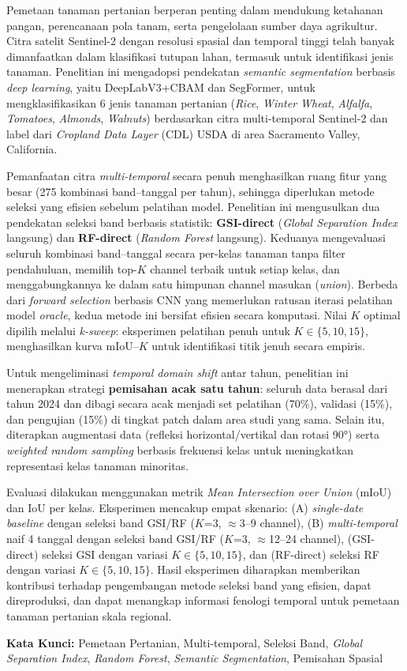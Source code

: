 Pemetaan tanaman pertanian berperan penting dalam mendukung ketahanan pangan, perencanaan pola tanam, serta pengelolaan sumber daya agrikultur.
Citra satelit Sentinel-2 dengan resolusi spasial dan temporal tinggi telah banyak dimanfaatkan dalam klasifikasi tutupan lahan, termasuk untuk identifikasi jenis tanaman.
Penelitian ini mengadopsi pendekatan \textit{semantic segmentation} berbasis \textit{deep learning}, yaitu DeepLabV3+CBAM dan SegFormer, untuk mengklasifikasikan 6 jenis tanaman pertanian (\textit{Rice}, \textit{Winter Wheat}, \textit{Alfalfa}, \textit{Tomatoes}, \textit{Almonds}, \textit{Walnuts}) berdasarkan citra multi-temporal Sentinel-2 dan label dari \textit{Cropland Data Layer} (CDL) USDA di area Sacramento Valley, California.

Pemanfaatan citra \textit{multi-temporal} secara penuh menghasilkan ruang fitur yang besar (275 kombinasi band--tanggal per tahun), sehingga diperlukan metode seleksi yang efisien sebelum pelatihan model.
Penelitian ini mengusulkan dua pendekatan seleksi band berbasis statistik: \textbf{GSI-direct} (\textit{Global Separation Index} langsung) dan \textbf{RF-direct} (\textit{Random Forest} langsung).
Keduanya mengevaluasi seluruh kombinasi band--tanggal secara per-kelas tanaman tanpa filter pendahuluan, memilih top-$K$ channel terbaik untuk setiap kelas, dan menggabungkannya ke dalam satu himpunan channel masukan (\textit{union}).
Berbeda dari \textit{forward selection} berbasis CNN yang memerlukan ratusan iterasi pelatihan model \textit{oracle}, kedua metode ini bersifat efisien secara komputasi.
Nilai $K$ optimal dipilih melalui \textit{k-sweep}: eksperimen pelatihan penuh untuk $K \in \{5, 10, 15\}$, menghasilkan kurva mIoU--$K$ untuk identifikasi titik jenuh secara empiris.

Untuk mengeliminasi \textit{temporal domain shift} antar tahun, penelitian ini menerapkan strategi \textbf{pemisahan acak satu tahun}: seluruh data berasal dari tahun 2024 dan dibagi secara acak menjadi set pelatihan (70\%), validasi (15\%), dan pengujian (15\%) di tingkat patch dalam area studi yang sama.
Selain itu, diterapkan augmentasi data (refleksi horizontal/vertikal dan rotasi 90°) serta \textit{weighted random sampling} berbasis frekuensi kelas untuk meningkatkan representasi kelas tanaman minoritas.

Evaluasi dilakukan menggunakan metrik \textit{Mean Intersection over Union} (mIoU) dan IoU per kelas.
Eksperimen mencakup empat skenario: (A) \textit{single-date baseline} dengan seleksi band GSI/RF ($K$=3, $\approx$3--9 channel), (B) \textit{multi-temporal} naif 4 tanggal dengan seleksi band GSI/RF ($K$=3, $\approx$12--24 channel), (GSI-direct) seleksi GSI dengan variasi $K \in \{5,10,15\}$, dan (RF-direct) seleksi RF dengan variasi $K \in \{5,10,15\}$.
Hasil eksperimen diharapkan memberikan kontribusi terhadap pengembangan metode seleksi band yang efisien, dapat direproduksi, dan dapat menangkap informasi fenologi temporal untuk pemetaan tanaman pertanian skala regional.

\vspace{0.5cm}
\textbf{Kata Kunci:} Pemetaan Pertanian, Multi-temporal, Seleksi Band, \textit{Global Separation Index}, \textit{Random Forest}, \textit{Semantic Segmentation}, Pemisahan Spasial
